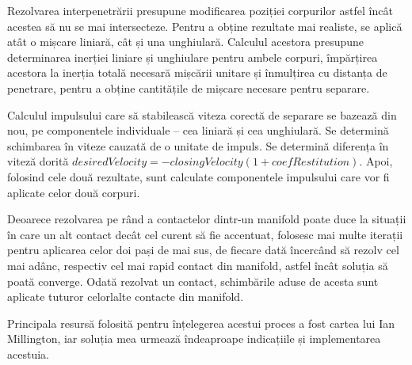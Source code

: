\documentclass[12pt,a4paper]{report}
\begin{document}
Rezolvarea interpenetrării presupune modificarea poziției corpurilor astfel încât acestea să nu se mai intersecteze. Pentru a obține rezultate mai realiste, se aplică atât o mișcare liniară, cât și una unghiulară. Calculul acestora presupune determinarea inerției liniare și unghiulare pentru ambele corpuri, împărțirea acestora la inerția totală necesară mișcării unitare și înmulțirea cu distanța de penetrare, pentru a obține cantitățile de mișcare necesare pentru separare.

Calculul impulsului care să stabilească viteza corectă de separare se bazează din nou, pe componentele individuale -- cea liniară și cea unghiulară. Se determină schimbarea în viteze cauzată de o unitate de impuls. Se determină diferența în viteză dorită $desiredVelocity = -closingVelocity(1 + coefRestitution)$. Apoi, folosind cele două rezultate, sunt calculate componentele impulsului care vor fi aplicate celor două corpuri.

Deoarece rezolvarea pe rând a contactelor dintr-un manifold poate duce la situații în care un alt contact decât cel curent să fie accentuat, folosesc mai multe iterații pentru aplicarea celor doi pași de mai sus, de fiecare dată încercând să rezolv cel mai adânc, respectiv cel mai rapid contact din manifold, astfel încât soluția să poată converge. Odată rezolvat un contact, schimbările aduse de acesta sunt aplicate tuturor celorlalte contacte din manifold.

Principala resursă folosită pentru înțelegerea acestui proces a fost cartea\cite{millington} lui Ian Millington, iar soluția mea urmează îndeaproape indicațiile și implementarea acestuia.
\end{document}
